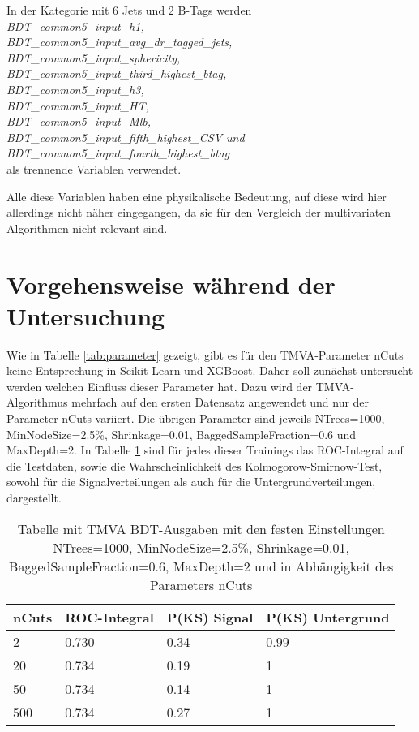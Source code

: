 In der Kategorie mit 6 Jets und 2 B-Tags werden \\ {\it BDT\_common5\_input\_h1, \\BDT\_common5\_input\_avg\_dr\_tagged\_jets, \\BDT\_common5\_input\_sphericity, \\BDT\_common5\_input\_third\_highest\_btag, \\BDT\_common5\_input\_h3, \\BDT\_common5\_input\_HT, \\BDT\_common5\_input\_Mlb, \\BDT\_common5\_input\_fifth\_highest\_CSV und \\BDT\_common5\_input\_fourth\_highest\_btag}\\als trennende Variablen verwendet.

Alle diese Variablen haben eine physikalische Bedeutung, auf diese wird hier allerdings nicht n\"aher eingegangen, da sie f\"ur den Vergleich der multivariaten Algorithmen nicht relevant sind.

\section{Vorgehensweise w\"ahrend der Untersuchung}
\label{ch:Vergleich:sec:Vorgehensweise}

Wie in Tabelle \ref{tab:parameter} gezeigt, gibt es f\"ur den TMVA-Parameter nCuts keine Entsprechung in Scikit-Learn und XGBoost. Daher soll zun\"achst untersucht werden welchen Einfluss dieser Parameter hat. Dazu wird der TMVA-Algorithmus mehrfach auf den ersten Datensatz angewendet und nur der Parameter nCuts variiert. Die \"ubrigen Parameter sind jeweils NTrees=1000, MinNodeSize=2.5\%, Shrinkage=0.01, BaggedSampleFraction=0.6 und MaxDepth=2.
In Tabelle \ref{tab:nCuts} sind f\"ur jedes dieser Trainings das ROC-Integral auf die Testdaten, sowie die Wahrscheinlichkeit des Kolmogorow-Smirnow-Test, sowohl f\"ur die Signalverteilungen als auch f\"ur die Untergrundverteilungen, dargestellt.

\begin{table}[tbp]\parbox{12cm}{
  \caption[Variation des TMVA-nCuts-Parameters]{Tabelle mit TMVA BDT-Ausgaben mit den festen Einstellungen NTrees=1000, MinNodeSize=2.5\%, Shrinkage=0.01, BaggedSampleFraction=0.6, MaxDepth=2 und in Abh\"angigkeit des Parameters nCuts}%
  }\label{tab:nCuts}
  \begin{center}
  \begin{tabular}{llll}
  \hline
  nCuts & ROC-Integral & P(KS) Signal & P(KS) Untergrund\\
  \hline
  \num{2} & \num{0,730} & \num{0,34} & \num{0,99}\\
 \num{20} & \num{0,734} & \num{0,19} & \num{1}\\
 \num{50} & \num{0,734} & \num{0,14} & \num{1}\\
\num{500} & \num{0,734} & \num{0,27} & \num{1}\\
  \hline
  \end{tabular}
  \end{center}
\end{table}

